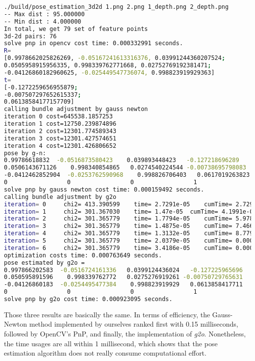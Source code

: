 \begin{lstlisting}[language=sh,caption=Terminal output:]
./build/pose_estimation_3d2d 1.png 2.png 1_depth.png 2_depth.png
-- Max dist : 95.000000 
-- Min dist : 4.000000 
In total, we get 79 set of feature points
3d-2d pairs: 76
solve pnp in opencv cost time: 0.000332991 seconds.
R=
[0.9978662025826269, -0.05167241613316376, 0.03991244360207524;
0.0505958915956335, 0.998339762771668, 0.02752769192381471;
-0.04126860182960625, -0.025449547736074, 0.998823919929363]
t=
[-0.1272259656955879;
-0.007507297652615337;
0.06138584177157709]
calling bundle adjustment by gauss newton
iteration 0 cost=645538.1857253
iteration 1 cost=12750.239874896
iteration 2 cost=12301.774589343
iteration 3 cost=12301.427574651
iteration 4 cost=12301.426806652
pose by g-n: 
0.99786618832  -0.0516873580423    0.039893448423   -0.127218696289
0.0506143671126    0.998340854865   0.0274540224544 -0.00738695798083
-0.0412462852904  -0.0253762590968    0.998826706403   0.0617019263823
0                 0                 0                 1
solve pnp by gauss newton cost time: 0.000159492 seconds.
calling bundle adjustment by g2o
iteration= 0	 chi2= 413.390599	 time= 2.7291e-05	 cumTime= 2.7291e-05	 edges= 76	 schur= 0	 lambda= 79.000412	 levenbergIter= 1
iteration= 1	 chi2= 301.367030	 time= 1.47e-05	 cumTime= 4.1991e-05	 edges= 76	 schur= 0	 lambda= 26.333471	 levenbergIter= 1
iteration= 2	 chi2= 301.365779	 time= 1.7794e-05	 cumTime= 5.9785e-05	 edges= 76	 schur= 0	 lambda= 17.555647	 levenbergIter= 1
iteration= 3	 chi2= 301.365779	 time= 1.4875e-05	 cumTime= 7.466e-05	 edges= 76	 schur= 0	 lambda= 11.703765	 levenbergIter= 1
iteration= 4	 chi2= 301.365779	 time= 1.3132e-05	 cumTime= 8.7792e-05	 edges= 76	 schur= 0	 lambda= 7.802510	 levenbergIter= 1
iteration= 5	 chi2= 301.365779	 time= 2.0379e-05	 cumTime= 0.000108171	 edges= 76	 schur= 0	 lambda= 41.613386	 levenbergIter= 3
iteration= 6	 chi2= 301.365779	 time= 3.4186e-05	 cumTime= 0.000142357	 edges= 76	 schur= 0	 lambda= 2859650082279.672363	 levenbergIter= 8
optimization costs time: 0.000763649 seconds.
pose estimated by g2o =
0.997866202583  -0.0516724161336   0.0399124436024   -0.127225965696
0.050595891596    0.998339762772   0.0275276919261 -0.00750729765631
-0.04126860183  -0.0254495477384    0.998823919929   0.0613858417711
0                 0                 0                 1
solve pnp by g2o cost time: 0.000923095 seconds.
\end{lstlisting}


Those three results are basically the same. In terms of efficiency, the Gauss-Newton method implemented by ourselves ranked first with 0.15 milliseconds, followed by OpenCV's PnP, and finally, the implementation of \textit{g2o}. Nonetheless, the time usages are all within 1 millisecond, which shows that the pose estimation algorithm does not really consume computational effort.

